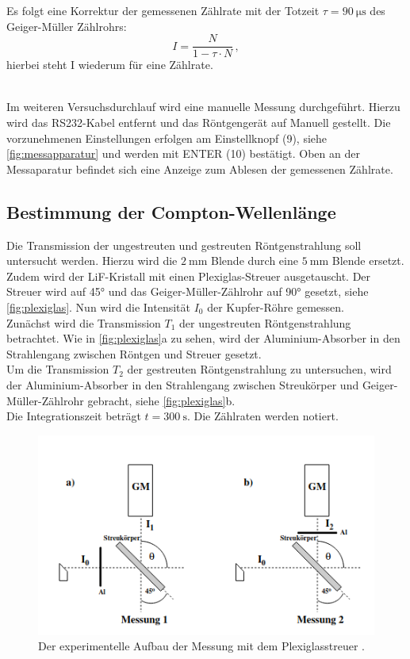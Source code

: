 Es folgt eine Korrektur der gemessenen Zählrate mit der Totzeit $\tau = \SI{90}{\micro\second}$ des Geiger-Müller Zählrohrs:
\begin{equation*}
    I = \frac{N}{1 - \tau \cdot N} \, ,
\end{equation*}
hierbei steht I wiederum für eine Zählrate.

\\
\noindent
Im weiteren Versuchsdurchlauf wird eine manuelle Messung durchgeführt.
Hierzu wird das RS232-Kabel entfernt und das Röntgengerät auf Manuell gestellt.
Die vorzunehmenen Einstellungen erfolgen am Einstellknopf (9), siehe \autoref{fig:messapparatur} und werden mit ENTER (10) bestätigt.
Oben an der Messaparatur befindet sich eine Anzeige zum Ablesen der gemessenen Zählrate.

\subsection{Bestimmung der Compton-Wellenlänge}
Die Transmission der ungestreuten und gestreuten Röntgenstrahlung soll untersucht werden.
Hierzu wird die $\SI{2}{\milli\metre}$ Blende durch eine $\SI{5}{\milli\metre}$ Blende ersetzt.
Zudem wird der LiF-Kristall mit einen Plexiglas-Streuer ausgetauscht.
Der Streuer wird auf 45° und das Geiger-Müller-Zählrohr auf 90° gesetzt, siehe \autoref{fig:plexiglas}.
Nun wird die Intensität $I_0$ der Kupfer-Röhre gemessen. \\
\noindent
Zunächst wird die Transmission $T_1$ der ungestreuten Röntgenstrahlung betrachtet.
Wie in \autoref{fig:plexiglas}a zu sehen, wird der Aluminium-Absorber in den Strahlengang zwischen Röntgen und Streuer gesetzt. \\
\noindent
Um die Transmission $T_2$ der gestreuten Röntgenstrahlung zu untersuchen, wird der Aluminium-Absorber in den Strahlengang zwischen Streukörper und Geiger-Müller-Zählrohr gebracht,
siehe \autoref{fig:plexiglas}b. \\
Die Integrationszeit beträgt $t = \SI{300}{\second}$.
Die Zählraten werden notiert.

\begin{figure}
    \centering
    \includegraphics[width=\textwidth]{bilder/plexiglas_aufbau.png}
    \caption{Der experimentelle Aufbau der Messung mit dem Plexiglasstreuer \cite{anleitung}. }
    \label{fig:plexiglas}
\end{figure}